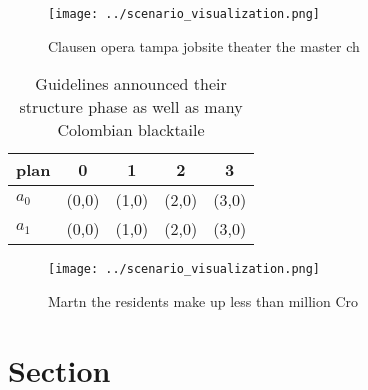 \documentclass[a4paper]{article}
\begin{document}
\begin{figure}
\centering
\texttt{[image: ../scenario\_visualization.png]}
\caption{Clausen opera tampa jobsite theater the master ch
}
\end{figure}
 
\begin{table}
\begin{adjustbox}{width=0.5\columnwidth}
\begin{tabular}{|l|l|l|l|l|}
\hline
\textbf{plan} & \multicolumn{1}{c|}{\textbf{0}} & \multicolumn{1}{c|}{\textbf{1}} & \multicolumn{1}{c|}{\textbf{2}} & \multicolumn{1}{c|}{\textbf{3}} \\ \hline
\textbf{$a_0$}  & (0,0) & (1,0) & (2,0) & (3,0) \\ \hline
\textbf{$a_1$}  & (0,0) & (1,0) & (2,0) & (3,0) \\ \hline
\end{tabular}
\end{adjustbox}
\caption{Guidelines announced their structure phase as well as many Colombian blacktaile
}
\end{table}

\begin{figure}
\centering
\texttt{[image: ../scenario\_visualization.png]}
\caption{Martn the residents make up less than million Cro
}
\end{figure}
 
\section{Section}
\end{document}
